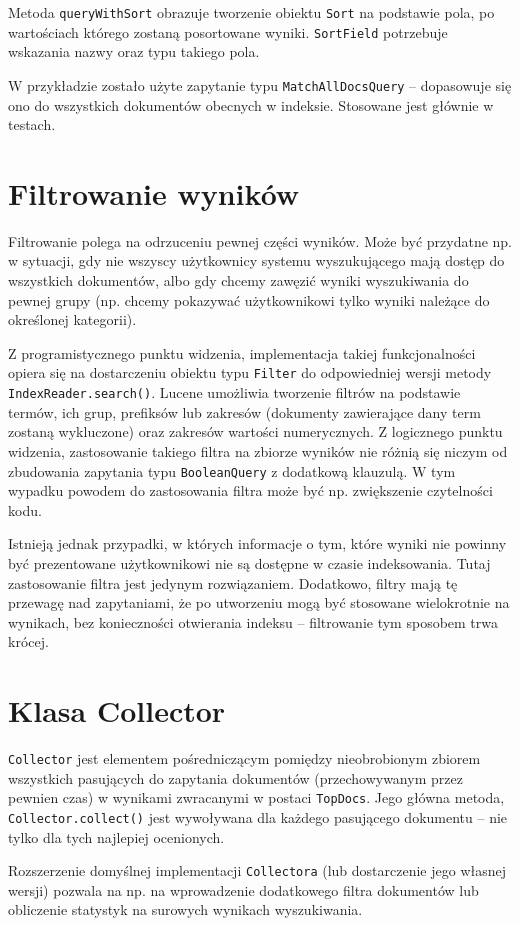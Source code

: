Metoda \texttt{queryWithSort} obrazuje tworzenie obiektu \texttt{Sort} na podstawie pola, po wartościach którego zostaną posortowane wyniki. \texttt{SortField} potrzebuje wskazania nazwy oraz typu takiego pola. 

W przykładzie zostało użyte zapytanie typu \texttt{MatchAllDocsQuery} -- dopasowuje się ono do wszystkich dokumentów obecnych w indeksie. Stosowane jest głównie w testach.

\section{Filtrowanie wyników}

Filtrowanie polega na odrzuceniu pewnej części wyników. Może być przydatne np. w sytuacji, gdy nie wszyscy użytkownicy systemu wyszukującego mają dostęp do wszystkich dokumentów, albo gdy chcemy zawęzić wyniki wyszukiwania do pewnej grupy (np. chcemy pokazywać użytkownikowi tylko wyniki należące do określonej kategorii).

Z programistycznego punktu widzenia, implementacja takiej funkcjonalności opiera się na dostarczeniu obiektu typu \texttt{Filter} do odpowiedniej wersji metody \texttt{IndexReader.search()}. Lucene umożliwia tworzenie filtrów na podstawie termów, ich grup, prefiksów lub zakresów (dokumenty zawierające dany term zostaną wykluczone) oraz zakresów wartości numerycznych. Z logicznego punktu widzenia, zastosowanie takiego filtra na zbiorze wyników nie różnią się niczym od zbudowania zapytania typu \texttt{BooleanQuery} z dodatkową klauzulą. W tym wypadku powodem do zastosowania filtra może być np. zwiększenie czytelności kodu. 

Istnieją jednak przypadki, w których informacje o tym, które wyniki nie powinny być prezentowane użytkownikowi nie są dostępne w czasie indeksowania. Tutaj zastosowanie filtra jest jedynym rozwiązaniem. Dodatkowo, filtry mają tę przewagę nad zapytaniami, że po utworzeniu mogą być stosowane wielokrotnie na wynikach, bez konieczności otwierania indeksu -- filtrowanie tym sposobem trwa krócej. 

\section{Klasa Collector}

\texttt{Collector} jest elementem pośredniczącym pomiędzy nieobrobionym zbiorem wszystkich pasujących do zapytania dokumentów (przechowywanym przez pewnien czas) w wynikami zwracanymi w postaci \texttt{TopDocs}. Jego główna metoda, \texttt{Collector.collect()} jest wywoływana dla każdego pasującego dokumentu -- nie tylko dla tych najlepiej ocenionych. 

Rozszerzenie domyślnej implementacji \texttt{Collectora} (lub dostarczenie jego własnej wersji) pozwala na np. na wprowadzenie dodatkowego filtra dokumentów lub obliczenie statystyk na surowych wynikach wyszukiwania.